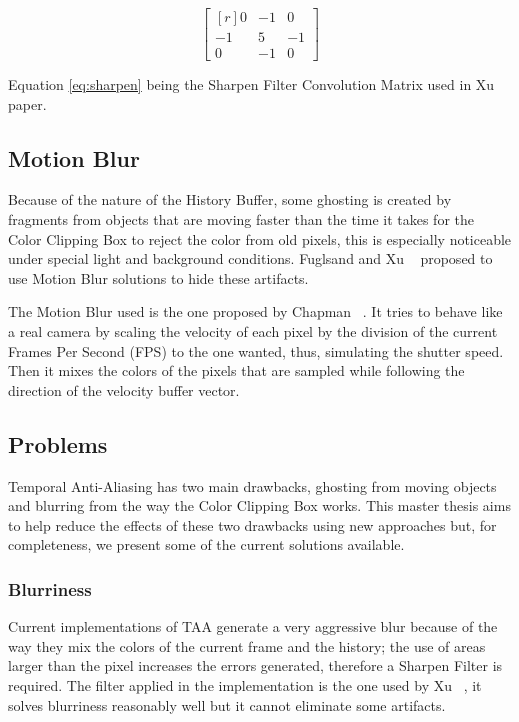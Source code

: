 \documentclass{cslthse-msc}
\begin{document}
\begin{equation} \label{eq:sharpen}
\begin{bmatrix*}[r]
0 & -1 &  0 \\
-1 &  5 & -1 \\
0 & -1 &  0
\end{bmatrix*}
\end{equation}

Equation \ref{eq:sharpen} being the Sharpen Filter Convolution Matrix  used in Xu paper. \protect\cite{XU2016}

\subsection{Motion Blur}
Because of the nature of the History Buffer, some ghosting is created by fragments  from objects that are moving faster than the time it takes for the Color Clipping Box to reject the color from old pixels, this is especially noticeable under special light and background conditions. Fuglsand and Xu ~\cite{Fuglsand2016,XU2016} proposed to use Motion Blur solutions to hide these artifacts.

The Motion Blur used is the one proposed by Chapman ~\cite{Chapman2012}. It tries to behave like a real camera by scaling the velocity of each pixel by the division of the current Frames Per Second (FPS) to the one wanted, thus, simulating the shutter speed. Then it mixes the colors of the pixels that are sampled while following the direction of the velocity buffer vector.


\subsection{Problems}
Temporal Anti-Aliasing has two main drawbacks, ghosting from moving objects and blurring from the way the Color Clipping Box works. This master thesis aims to help reduce the effects of these two drawbacks using new approaches but, for completeness, we present some of the current solutions available. 

\subsubsection{Blurriness} 
Current implementations of TAA generate a very aggressive blur because of the way they mix the colors of the current frame and the history; the use of areas larger than the pixel increases the errors generated, therefore a Sharpen Filter is required. The filter applied in the implementation is the one used by Xu ~\cite{XU2016}, it solves blurriness reasonably well but it cannot eliminate some artifacts. 
\end{document}
